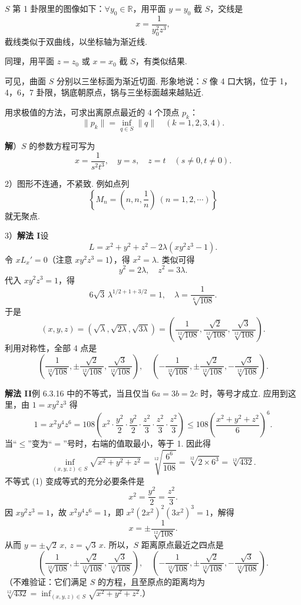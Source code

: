 \documentclass[UTF8, 12pt, fontset=fandol, oneside]{ctexart}
\begin{document}
$S$ 第 1 卦限里的图像如下：$\forall y_0\in\mathbb{R}$，用平面 $y=y_0$ 截 $S$，交线是
\[
  x=\frac{1}{y_0^2z^3},
\]
截线类似于双曲线，以坐标轴为渐近线.

同理，用平面 $z=z_0$ 或 $x=x_0$ 截 $S$，有类似结果.

可见，曲面 $S$ 分别以三坐标面为渐近切面. 形象地说：$S$ 像 4 口大锅，位于 1，4，6，7 卦限，锅底朝原点，锅与三坐标面越来越贴近.

用求极值的方法，可求出离原点最近的 4 个顶点 $p_k$：
\[
  \|p_k\|=\inf_{q\in S}\|q\|\quad(k=1,2,3,4).
\]

\noindent\textbf{解}）$S$ 的参数方程可写为
\[
  x=\frac{1}{s^2t^3},\quad y=s,\quad z=t\quad(s\ne0,t\ne0).
\]

2）图形不连通，不紧致. 例如点列
\[
  \left\{M_n=\left(n,n,\frac1n\right)\ (n=1,2,\cdots)\right\}
\]
就无聚点.

3）\noindent\textbf{解法 I}\quad 设
\[
  L=x^2+y^2+z^2-2\lambda(xy^2z^3-1).
\]
令 $xL_x'=0$（注意 $xy^2z^3=1$），得 $x^2=\lambda$. 类似可得
\[
  y^2=2\lambda,\quad z^2=3\lambda.
\]
代入 $xy^2z^3=1$，得
\[
  6\sqrt3\,\lambda^{1/2+1+3/2}=1,\quad
  \lambda=\frac1{\sqrt[6]{108}}.
\]
于是
\[
  (x,y,z)=(\sqrt\lambda,\sqrt{2\lambda},\sqrt{3\lambda})
  =\left(\frac1{\sqrt[12]{108}},\frac{\sqrt2}{\sqrt[12]{108}},
  \frac{\sqrt3}{\sqrt[12]{108}}\right).
\]
利用对称性，全部 4 点是
\[
  \left(\frac1{\sqrt[12]{108}},\pm\frac{\sqrt2}{\sqrt[12]{108}},
  \frac{\sqrt3}{\sqrt[12]{108}}\right),\quad
  \left(-\frac1{\sqrt[12]{108}},\pm\frac{\sqrt2}{\sqrt[12]{108}},
  -\frac{\sqrt3}{\sqrt[12]{108}}\right).
\]

\noindent\textbf{解法 II}\quad 例 6.3.16 中的不等式，当且仅当 $6a=3b=2c$ 时，等号才成立. 应用到这里，由 $1=xy^2z^3$ 得
\[
  1=x^2y^4z^6
  =108\left(x^2\cdot\frac{y^2}{2}\cdot\frac{y^2}{2}\cdot
  \frac{z^2}{3}\cdot\frac{z^2}{3}\cdot\frac{z^2}{3}\right)
  \le108\left(\frac{x^2+y^2+z^2}{6}\right)^6. \tag{1}
\]
当“$\le$”变为“$=$”号时，右端的值取最小，等于 1. 因此得
\[
  \inf_{(x,y,z)\in S}\sqrt{x^2+y^2+z^2}
  =\sqrt[12]{\frac{6^6}{108}}
  =\sqrt[12]{2\times6^3}
  =\sqrt[12]{432}.
\]
不等式 (1) 变成等式的充分必要条件是
\[
  x^2=\frac{y^2}{2}=\frac{z^2}{3}.
\]
因 $xy^2z^3=1$，故 $x^2y^4z^6=1$，即 $x^2(2x^2)^2(3x^2)^3=1$，解得
\[
  x=\pm\frac1{\sqrt[12]{108}}.
\]
从而 $y=\pm\sqrt2\,x,\ z=\sqrt3\,x$. 所以，$S$ 距离原点最近之四点是
\[
  \left(\frac1{\sqrt[12]{108}},\pm\frac{\sqrt2}{\sqrt[12]{108}},
  \frac{\sqrt3}{\sqrt[12]{108}}\right),\quad
  \left(-\frac1{\sqrt[12]{108}},\pm\frac{\sqrt2}{\sqrt[12]{108}},
  -\frac{\sqrt3}{\sqrt[12]{108}}\right).
\]
（不难验证：它们满足 $S$ 的方程，且至原点的距离均为 $\sqrt[12]{432}=\inf_{(x,y,z)\in S}\sqrt{x^2+y^2+z^2}$.）
\end{document}
